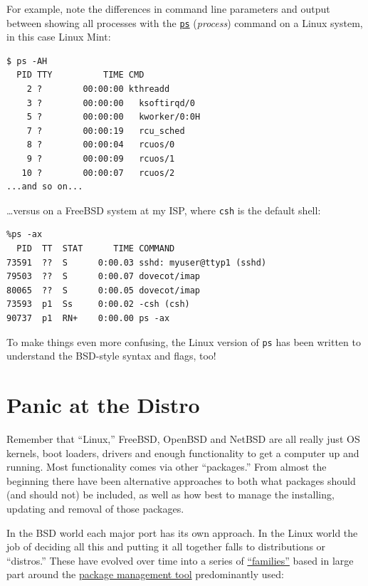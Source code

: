 \documentclass[10pt,]{book}
\numberwithin{figure}{chapter}
\begin{document}
For example, note the differences in command line parameters and output
between showing all processes with the
\href{http://linux.die.net/man/1/ps}{\texttt{ps}} (\emph{process})
command on a Linux system, in this case Linux Mint:

\begin{verbatim}
$ ps -AH
  PID TTY          TIME CMD
    2 ?        00:00:00 kthreadd
    3 ?        00:00:00   ksoftirqd/0
    5 ?        00:00:00   kworker/0:0H
    7 ?        00:00:19   rcu_sched
    8 ?        00:00:04   rcuos/0
    9 ?        00:00:09   rcuos/1
   10 ?        00:00:07   rcuos/2
...and so on...
\end{verbatim}

\ldots{}versus on a FreeBSD system at my ISP, where \texttt{csh} is the
default shell:

\begin{verbatim}
%ps -ax
  PID  TT  STAT      TIME COMMAND
73591  ??  S      0:00.03 sshd: myuser@ttyp1 (sshd)
79503  ??  S      0:00.07 dovecot/imap
80065  ??  S      0:00.05 dovecot/imap
73593  p1  Ss     0:00.02 -csh (csh)
90737  p1  RN+    0:00.00 ps -ax
\end{verbatim}

To make things even more confusing, the Linux version of \texttt{ps} has
been written to understand the BSD-style syntax and flags, too!

\section{Panic at the Distro}\label{panic-at-the-distro}

Remember that ``Linux,'' FreeBSD, OpenBSD and NetBSD are all really just
OS kernels, boot loaders, drivers and enough functionality to get a
computer up and running. Most functionality comes via other
``packages.'' From almost the beginning there have been alternative
approaches to both what packages should (and should not) be included, as
well as how best to manage the installing, updating and removal of those
packages.

In the BSD world each major port has its own approach. In the Linux
world the job of deciding all this and putting it all together falls to
distributions or ``distros.''  These have evolved
over time into a series of
\href{https://en.wikipedia.org/wiki/Linux_distribution\#Popular_distributions}{``families''}
based in large part around the
\href{https://en.wikipedia.org/wiki/Package_manager}{package management
tool} predominantly used:
\end{document}

